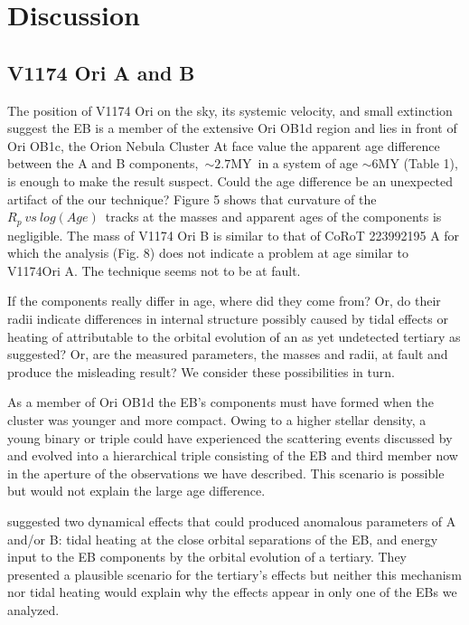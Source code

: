 \documentclass[12pt,preprint]{aastex6}
\begin{document}
\section{Discussion}


\subsection{V1174 Ori  A and B}

The position of V1174 Ori on the sky, its systemic velocity,
and small extinction suggest the EB is a member 
of the extensive Ori OB1d region 
and lies in front of Ori OB1c, the Orion Nebula Cluster
\citep{2004ApJS..151..357S}
 At face value the apparent age difference between 
the A and B components,~$\sim 2.7$MY~in a system of age 
$\sim 6$MY (Table 1), is enough to make the result suspect.
Could the age difference be  an unexpected artifact of the
our technique? Figure 5 shows that curvature of the 
$R_p~vs~log(Age)$~tracks at the masses and apparent
ages of the components is negligible. The mass of V1174 Ori B
is similar to that of CoRoT 223992195 A for which the analysis
(Fig. 8) does not indicate a problem at age similar to V1174Ori A.
The technique seems not to be at fault. 


If the components really differ in age, where did they come from? 
Or, do their radii indicate differences in internal structure
possibly caused by tidal effects or heating of attributable
to the orbital evolution of an  as yet undetected tertiary as
\citet{2014NewAR..60....1S} suggested?  Or,  are
the measured parameters, the masses and radii, at fault and
produce the misleading result?  We consider these 
possibilities in turn.


As a member of Ori OB1d the EB's components must have formed when
the cluster was younger and more compact. Owing to a higher
stellar density, a young  binary or triple could have 
experienced the scattering events discussed by 
\citet{2012Natur.492..221R} and evolved into a hierarchical triple
consisting of the EB and  third member now in the aperture of the 
observations we have described.  This scenario is possible but
would not explain the large age difference. 


\citet{2004ApJS..151..357S} suggested two dynamical effects
that could produced anomalous parameters of A and/or B:
tidal heating at the close orbital separations of the EB, and
energy input to the EB components by the orbital evolution
of a tertiary.  They presented a plausible scenario for the
tertiary's effects but neither this mechanism nor tidal heating
would explain why the effects appear in only one of the EBs
we analyzed. 
\end{document}
